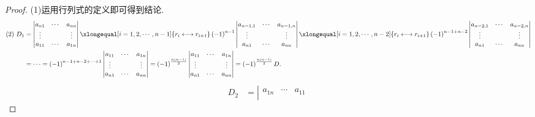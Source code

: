 \documentclass[lang=cn,newtx,10pt,scheme=chinese]{elegantbook}
\begin{document}
\begin{proof}
    (1)运用行列式的定义即可得到结论.
    \begin{align*}
        (2)\,\,D_1&=\left| \begin{matrix}
            a_{n1}&		\cdots&		a_{nn}\\
            \vdots&		&		\vdots\\
            a_{11}&		\cdots&		a_{1n}\\
        \end{matrix} \right|\xlongequal[i=1,2,\cdots ,n-1]{r_i\longleftrightarrow r_{i+1}}\left( -1 \right) ^{n-1}\left| \begin{matrix}
            a_{n-1,1}&		\cdots&		a_{n-1,n}\\
            \vdots&		&		\vdots\\
            a_{n1}&		\cdots&		a_{nn}\\
        \end{matrix} \right|\xlongequal[i=1,2,\cdots ,n-2]{r_i\longleftrightarrow r_{i+1}}\left( -1 \right) ^{n-1+n-2}\left| \begin{matrix}
            a_{n-2,1}&		\cdots&		a_{n-2,n}\\
            \vdots&		&		\vdots\\
            a_{n1}&		\cdots&		a_{nn}\\
        \end{matrix} \right|
        \\
        &=\cdots =\left( -1 \right) ^{n-1+n-2+\cdots +1}\left| \begin{matrix}
            a_{11}&		\cdots&		a_{1n}\\
            \vdots&		&		\vdots\\
            a_{n1}&		\cdots&		a_{nn}\\
        \end{matrix} \right|=\left( -1 \right) ^{\frac{n\left( n-1 \right)}{2}}\left| \begin{matrix}
            a_{11}&		\cdots&		a_{1n}\\
            \vdots&		&		\vdots\\
            a_{n1}&		\cdots&		a_{nn}\\
        \end{matrix} \right|=\left( -1 \right) ^{\frac{n\left( n-1 \right)}{2}}D.
    \end{align*}
    \begin{align*}
        D_2&=\left| \begin{matrix}
            a_{1n}&		\cdots&		a_{11}\\

\end{matrix}
\end{align*}
\end{proof}
\end{document}
